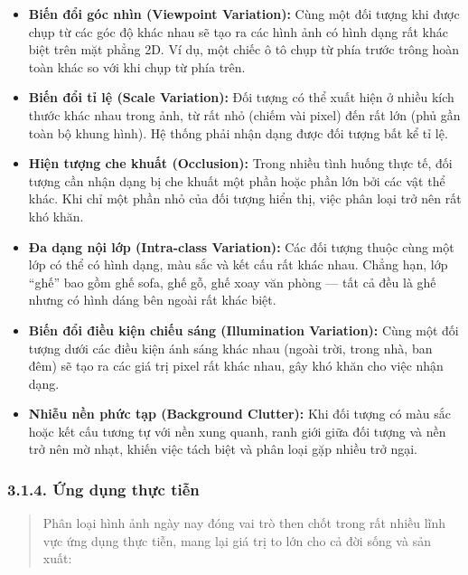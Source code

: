 \documentclass[
]{article}
\begin{document}
\begin{itemize}
\item \textbf{Biến đổi góc nhìn (Viewpoint Variation):} Cùng một đối tượng khi được chụp từ các góc độ khác nhau sẽ tạo ra các hình ảnh có hình dạng rất khác biệt trên mặt phẳng 2D. Ví dụ, một chiếc ô tô chụp từ phía trước trông hoàn toàn khác so với khi chụp từ phía trên.

\item \textbf{Biến đổi tỉ lệ (Scale Variation):} Đối tượng có thể xuất hiện ở nhiều kích thước khác nhau trong ảnh, từ rất nhỏ (chiếm vài pixel) đến rất lớn (phủ gần toàn bộ khung hình). Hệ thống phải nhận dạng được đối tượng bất kể tỉ lệ.

\item \textbf{Hiện tượng che khuất (Occlusion):} Trong nhiều tình huống thực tế, đối tượng cần nhận dạng bị che khuất một phần hoặc phần lớn bởi các vật thể khác. Khi chỉ một phần nhỏ của đối tượng hiển thị, việc phân loại trở nên rất khó khăn.

\item \textbf{Đa dạng nội lớp (Intra-class Variation):} Các đối tượng thuộc cùng một lớp có thể có hình dạng, màu sắc và kết cấu rất khác nhau. Chẳng hạn, lớp ``ghế'' bao gồm ghế sofa, ghế gỗ, ghế xoay văn phòng --- tất cả đều là ghế nhưng có hình dáng bên ngoài rất khác biệt.

\item \textbf{Biến đổi điều kiện chiếu sáng (Illumination Variation):} Cùng một đối tượng dưới các điều kiện ánh sáng khác nhau (ngoài trời, trong nhà, ban đêm) sẽ tạo ra các giá trị pixel rất khác nhau, gây khó khăn cho việc nhận dạng.

\item \textbf{Nhiễu nền phức tạp (Background Clutter):} Khi đối tượng có màu sắc hoặc kết cấu tương tự với nền xung quanh, ranh giới giữa đối tượng và nền trở nên mờ nhạt, khiến việc tách biệt và phân loại gặp nhiều trở ngại.
\end{itemize}

\subsubsection{3.1.4. Ứng dụng thực tiễn}

\begin{quote}
Phân loại hình ảnh ngày nay đóng vai trò then chốt trong rất nhiều lĩnh vực ứng dụng thực tiễn, mang lại giá trị to lớn cho cả đời sống và sản xuất:
\end{quote}
\end{document}

